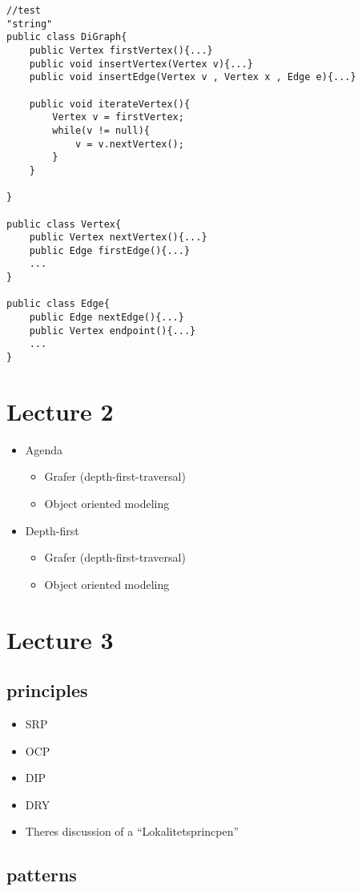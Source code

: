\documentclass[11pt]{amsart}
\begin{document}
\begin{lstlisting}
//test
"string"
public class DiGraph{
	public Vertex firstVertex(){...}
	public void insertVertex(Vertex v){...}
	public void insertEdge(Vertex v , Vertex x , Edge e){...}
	
	public void iterateVertex(){
		Vertex v = firstVertex;
		while(v != null){
			v = v.nextVertex();
		}
	}
	
}

public class Vertex{
	public Vertex nextVertex(){...}
	public Edge firstEdge(){...}
	...
}

public class Edge{
	public Edge nextEdge(){...}
	public Vertex endpoint(){...}
	...
}
\end{lstlisting}

\section{Lecture 2}
\begin{itemize}
\item Agenda
	\begin{itemize}
	\item Grafer (depth-first-traversal)
	\item Object oriented modeling
	\end{itemize}
\item Depth-first
	\begin{itemize}
	\item Grafer (depth-first-traversal)
	\item Object oriented modeling
	\end{itemize}
\end{itemize}

\section{Lecture 3}


\subsection{principles}
\begin{itemize}
\item SRP
\item OCP
\item DIP
\item DRY
\item Theres discussion of a ``Lokalitetsprincpen''
\end{itemize}

\subsection{patterns}
\end{document}
